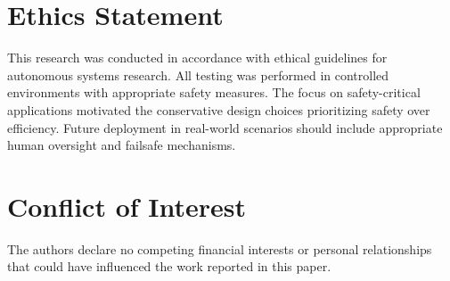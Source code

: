 \documentclass[10pt]{article}
\begin{document}
\section*{Ethics Statement}

This research was conducted in accordance with ethical guidelines for autonomous systems research. All testing was performed in controlled environments with appropriate safety measures. The focus on safety-critical applications motivated the conservative design choices prioritizing safety over efficiency. Future deployment in real-world scenarios should include appropriate human oversight and failsafe mechanisms.

\section*{Conflict of Interest}

The authors declare no competing financial interests or personal relationships that could have influenced the work reported in this paper.
\end{document}
